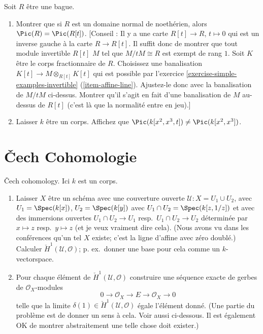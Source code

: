 \begin{exercise}
\label{exercise-traverso}
Soit $R$ être une bague.
\begin{enumerate}
\item Montrer que si $R$ est un domaine normal de
noethérien, alors $\Pic(R) = \Pic(R[t])$. [Conseil : Il
y a une carte $R[t] \to R$, $t \mapsto 0$ qui
est un inverse gauche à la carte $R \to R[t]$.
Il suffit donc de montrer que tout module invertible $R[t]$ $M$
tel que $M/tM \cong R$ est exempt
de rang $1$. Soit $K$ être le corps fractionnaire de $R$. Choisissez une
banalisation $K[t] \to M \otimes_{R[t]} K[t]$ qui est possible par l'exercice \ref{exercise-simple-examples-invertible} (\ref{item-affine-line}).
Ajustez-le donc avec la banalisation de $M/tM$ ci-dessus.
Montrer qu'il s'agit en fait d'une banalisation de $M$ au-dessus de
$R[t]$ (c'est là que la normalité entre en jeu).]
\item Laisser $k$ être un corps.
Affichez que $\Pic(k[x^2, x^3, t]) \not = \Pic(k[x^2, x^3])$.
\end{enumerate}
\end{exercise}













\section{{\v C}ech Cohomologie}
\label{section-cech-cohomology}

\begin{exercise}
\label{exercise-cech-cohomology}
{\v C}ech cohomology. Ici $k$ est un corps.
\begin{enumerate}
\item Laisser $X$ être un schéma avec une couverture
ouverte ${\mathcal U} : X = U_1 \cup U_2$, avec $U_1
= \Spec(k[x])$, $U_2 =
\Spec(k[y])$ avec $U_1 \cap U_2 = \Spec(k[z, 1/z])$ et avec des immersions
ouvertes $U_1 \cap U_2 \to U_1$ resp.\ $U_1 \cap U_2 \to U_2$
déterminée par $x \mapsto z$ resp.\ $y \mapsto z$ (et je veux
vraiment dire cela). (Nous avons vu dans les conférences qu'un tel $X$ existe;
c'est la ligne d'affine avec zéro doublé.) Calculer ${\check H}^1({\mathcal U}, {\mathcal O})$;
p.
ex.\ donner une base pour cela comme un $k$-vectorspace.
\item Pour chaque élément
de ${\check H}^1({\mathcal U}, {\mathcal O})$
construire une séquence exacte de gerbes de ${\mathcal O}_X$-modules
$$
0 \to {\mathcal O}_X \to E \to {\mathcal O}_X \to 0
$$
telle que la limite $\delta(1) \in {\check H}^1({\mathcal U}, {\mathcal O})$
égale l'élément donné.
(Une partie du problème est de donner un sens à cela. Voir aussi
ci-dessous. Il
est également OK de montrer abstraitement une telle chose doit exister.)
\end{enumerate}
\end{exercise}


